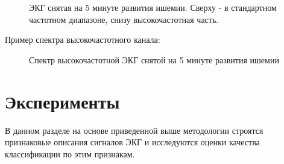 \documentclass[a4paper,12pt]{extarticle}
\begin{document}
\begin{figure}[H]
  \noindent{}
  \caption{ЭКГ снятая на 5 минуте развития ишемии. Сверху - в стандартном частотном диапазоне, снизу высокочастотная часть.}
\end{figure}

Пример спектра высокочастотного канала:

\begin{figure}[H]
  \noindent{}
  \caption{Спектр высокочастотной ЭКГ снятой на 5 минуте развития ишемии}
\end{figure}

\section{Эксперименты}

В данном разделе на основе приведенной выше методологии строятся признаковые описания сигналов ЭКГ и исследуются оценки качества классификации по этим признакам.
\end{document}
